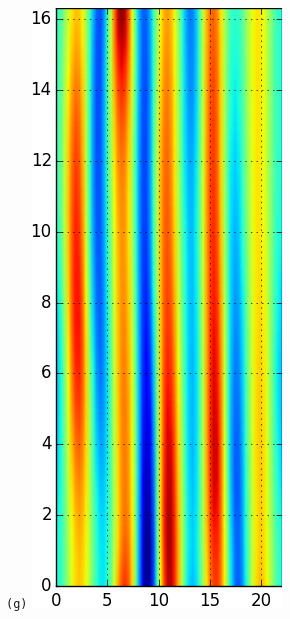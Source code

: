 \documentclass[final,leqno,onefignum,onetabnum]{siamltexmm}
\begin{document}
\begin{figure}[h]
\begin{minipage}{.115\textwidth}
  \end{minipage}
  \begin{minipage}{.115\textwidth}
    \centering \small{\texttt{(g)}}
    \includegraphics[width=\textwidth]{rpo1Fv10_64}

\end{minipage}
\end{figure}
\end{document}
